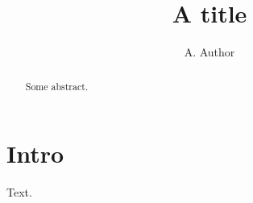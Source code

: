 \documentclass{eslwrap-auth}
\begin{document}
\begin{frontmatter}
\title{A title}
\author{A. Author}
\begin{abstract}Some abstract.\end{abstract}
\end{frontmatter}
\section{Intro}
Text.
\end{document}

